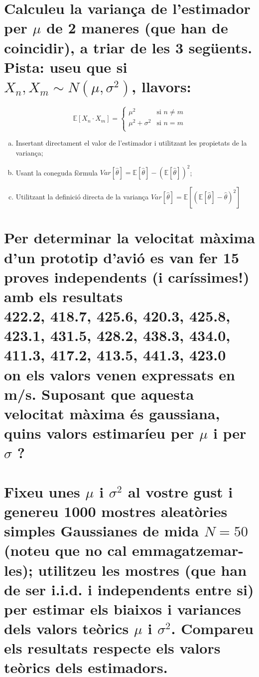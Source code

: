 \documentclass[a4paper,10pt]{article}
\begin{document}
\section{Calculeu la variança de l'estimador per $\mu$ de 2 maneres (que han de coincidir), a triar de les 3 següents. Pista: useu que si $X_n,X_m \sim N(\mu,\sigma^2)$, llavors:}

\begin{equation*}
\mathbb{E} [ X_n \cdot X_m ] =
 \begin{cases}
      \mu^2 & \text{si } n \neq m \\
      \mu^2 + \sigma^2 & \text{si } n = m\\
   \end{cases}
\end{equation*}

\begin{enumerate}[(a)]
\item Insertant directament el valor de l'estimador i utilitzant les propietats de la variança;
\item Usant la coneguda fòrmula $Var[\hat{\theta}] = \mathbb{E}[\hat{\theta}] - (\mathbb{E}[\hat{\theta}])^2$;
\item Utilitzant la definició directa de la variança $Var[\hat{\theta}] = \mathbb{E}[(\mathbb{E}[\hat{\theta}] - \hat{\theta})^2]$
\end{enumerate}

\section{Per determinar la velocitat màxima d'un prototip d'avió es van fer 15 proves independents (i
caríssimes!) amb els resultats
\\
422.2, 418.7, 425.6, 420.3, 425.8, 423.1, 431.5, 428.2, 438.3, 434.0, 411.3, 417.2, 413.5, 441.3, 423.0
\\
on els valors venen expressats en m/s. Suposant que aquesta velocitat màxima és gaussiana, quins
valors estimaríeu per $\mu$ i per $\sigma$ ?}

\section{Fixeu unes $\mu$ i $\sigma^2$ al vostre gust i genereu 1000 mostres aleatòries simples Gaussianes de mida $N = 50$ (noteu que no cal emmagatzemar-les); utilitzeu les mostres (que han de ser i.i.d. i
independents entre si) per estimar els biaixos i variances dels valors teòrics
$\mu$ i $\sigma^2$. Compareu els
resultats respecte els valors teòrics dels estimadors.
}
\end{document}
